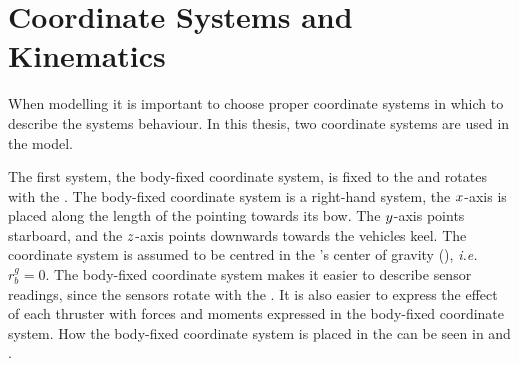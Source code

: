 \section{Coordinate Systems and Kinematics} 
\label{sec:coordinates} 
When modelling it is important to choose proper coordinate systems in which to describe the systems behaviour.
In this thesis, two coordinate systems are used in the \abbrROV model. 

The first system, the body-fixed coordinate system, is fixed to the \abbrROV and rotates with the \abbrROV. 
The body-fixed coordinate system is a right-hand system, the $x$-axis is placed along the length of the \abbrROV pointing towards its bow. The $y$-axis points starboard, and the $z$-axis points downwards towards the vehicles keel. The coordinate system is assumed to be centred in the \abbrROV's  center of gravity (\abbrCG), \emph{i.e.} $r^g_b = 0$. The body-fixed coordinate system makes it easier to describe sensor readings, since the sensors rotate with the \abbrROV. It is also easier to express the effect of each thruster with forces and moments expressed in the body-fixed coordinate system. How the body-fixed coordinate system is placed in the \abbrROV can be seen in  and .

